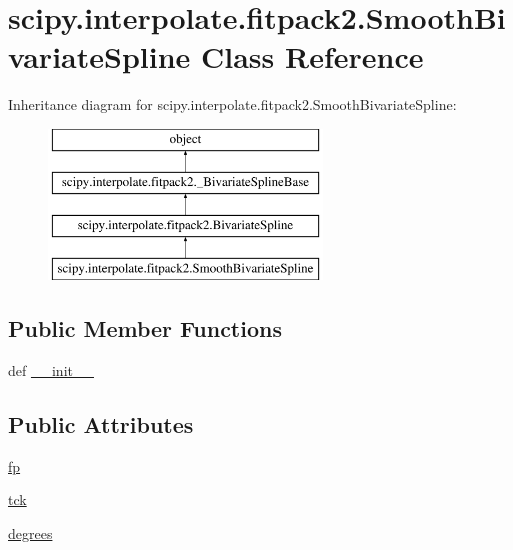 \hypertarget{classscipy_1_1interpolate_1_1fitpack2_1_1SmoothBivariateSpline}{}\section{scipy.\+interpolate.\+fitpack2.\+Smooth\+Bivariate\+Spline Class Reference}
\label{classscipy_1_1interpolate_1_1fitpack2_1_1SmoothBivariateSpline}
Inheritance diagram for scipy.\+interpolate.\+fitpack2.\+Smooth\+Bivariate\+Spline\+:\begin{figure}[H]
\begin{center}
\leavevmode
\includegraphics[height=4.000000cm]{classscipy_1_1interpolate_1_1fitpack2_1_1SmoothBivariateSpline}
\end{center}
\end{figure}
\subsection*{Public Member Functions}
\begin{DoxyCompactItemize}
\item 
def \hyperlink{classscipy_1_1interpolate_1_1fitpack2_1_1SmoothBivariateSpline_a2a5715e873c68fac0083919130bdecd0}{\+\_\+\+\_\+init\+\_\+\+\_\+}
\end{DoxyCompactItemize}
\subsection*{Public Attributes}
\begin{DoxyCompactItemize}
\item 
\hyperlink{classscipy_1_1interpolate_1_1fitpack2_1_1SmoothBivariateSpline_ac327a5d375e78d0371ee8d620bb5bd0b}{fp}
\item 
\hyperlink{classscipy_1_1interpolate_1_1fitpack2_1_1SmoothBivariateSpline_a7b6a3bbcf8998bc9d9267532087d77e4}{tck}
\item 
\hyperlink{classscipy_1_1interpolate_1_1fitpack2_1_1SmoothBivariateSpline_a1e66f2470bb311d2ba5893790fbda49e}{degrees}
\end{DoxyCompactItemize}


